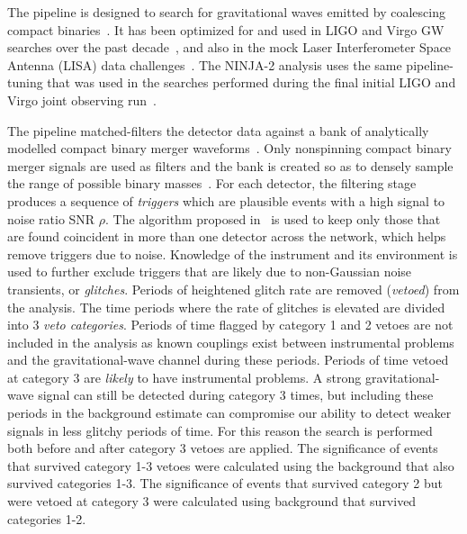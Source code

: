 The \ihope{} pipeline is designed to search for gravitational waves
emitted by coalescing compact binaries~\cite{Babak:2012zx}. It has been
optimized for and used in LIGO and Virgo GW searches over the past 
decade~\cite{Abbott:2007xi, Abbott:2009tt, Abbott:2009qj, Abadie:2010yb, 
Colaboration:2011np, Aasi:2012rja}, and also in the mock Laser 
Interferometer Space Antenna (LISA) data 
challenges~\cite{Babak:2008aa}. The NINJA-2 \ihope{} analysis uses the same 
pipeline-tuning that was used in the searches performed during 
the final initial LIGO and Virgo joint observing 
run~\cite{Colaboration:2011np}.

The pipeline matched-filters the detector data against a bank of
analytically modelled compact binary merger 
waveforms~\cite{Allen:2005fk,Babak:2012zx}. Only nonspinning compact binary 
merger signals are used as filters and the bank is created so as to densely 
sample the range of possible binary masses~\cite{Babak:2006ty}.
For each detector, the filtering stage produces 
a sequence of \textit{triggers} which are plausible events with a high 
signal to noise ratio SNR $\rho$. The algorithm proposed 
in~\cite{Robinson:2008un} is used to keep only those that are found coincident
in more than one detector across the network, which helps remove triggers due to 
noise. 
Knowledge of the instrument and its environment is used to further exclude
triggers that are likely due to non-Gaussian noise transients, or 
\textit{glitches}. Periods of heightened glitch rate are
removed (\emph{vetoed}) from the analysis. The time periods where the rate of 
glitches is elevated are divided into $3$ \emph{veto categories}. Periods of 
time flagged by category 1 and 2 vetoes are
not included in the analysis as known couplings exist between instrumental
problems and the gravitational-wave channel during these periods. Periods of
time vetoed at category 3 are \emph{likely} to have instrumental problems. A
strong gravitational-wave signal can still be detected during category 3 times,
but including these periods in the background estimate can compromise our
ability to detect weaker signals in less glitchy periods of time. For this
reason the search is performed both before and after category 3 vetoes are 
applied. The significance of events
that survived category 1-3 vetoes were calculated using the background that also
survived categories 1-3. The significance of events that survived category 2
but were vetoed at category 3 were calculated using background that survived
categories 1-2.

